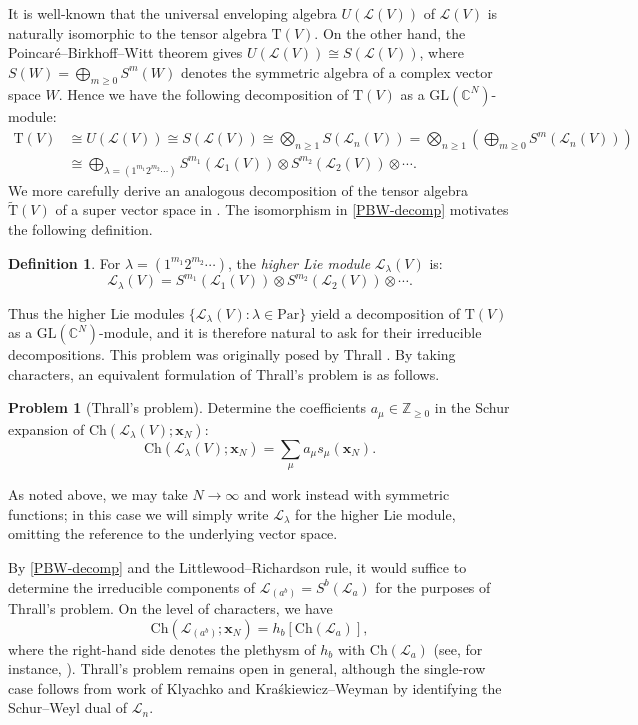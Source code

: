 \documentclass[11pt]{article}
\theoremstyle{definition}
\newtheorem{defi}[theo]{Definition}
\newtheorem{prob}[theo]{Problem}
\numberwithin{equation}{section}
\newcommand\CC{\mathbb{C}}
\newcommand\ZZ{\mathbb{Z}}
\newcommand\GL{\mathrm{GL}}
\newcommand\Srm{S}
\newcommand\Trm{\mathrm{T}}
\newcommand\xb{\mathbf{x}}
\newcommand\Lcal{\mathcal{L}}
\newcommand\Trmtil{\widetilde{\Trm}}
\newcommand\Ch{\mathrm{Ch}}
\begin{document}
It is well-known that the universal enveloping algebra $U(\Lcal(V))$ of $\Lcal(V)$ is naturally isomorphic to the tensor algebra $\Trm(V)$. On the other hand, the Poincar\'e--Birkhoff--Witt theorem gives $U(\Lcal(V)) \cong S(\Lcal(V))$, where $\Srm(W) = \bigoplus_{m \ge 0} \Srm^m(W)$ denotes the symmetric algebra of a complex vector space $W$. Hence we have the following decomposition of $\Trm(V)$ as a $\GL(\CC^N)$-module:
\begin{align}
\Trm(V) &\cong U(\Lcal(V)) \cong \Srm(\Lcal(V)) \cong \bigotimes_{n \ge 1} \Srm(\Lcal_n(V)) = \bigotimes_{n \ge 1} \left( \bigoplus_{m \ge 0} \Srm^m(\Lcal_n(V)) \right) \nonumber \\
&\cong \bigoplus_{\lambda = (1^{m_1}2^{m_2} \cdots)} \Srm^{m_1}(\Lcal_1(V)) \otimes \Srm^{m_2}(\Lcal_2(V)) \otimes \cdots. \label{PBW-decomp}
\end{align}
We more carefully derive an analogous decomposition of the tensor algebra $\Trmtil(V)$ of a super vector space in . The isomorphism in \eqref{PBW-decomp} motivates the following definition.
\begin{defi}\label{def:lie-mod}
For $\lambda = (1^{m_1}2^{m_2} \cdots)$, the \emph{higher Lie module} $\Lcal_\lambda(V)$ is:
\[
\Lcal_\lambda(V) = \Srm^{m_1}(\Lcal_1(V)) \otimes \Srm^{m_2}(\Lcal_2(V)) \otimes \cdots.
\]
\end{defi}
Thus the higher Lie modules $\{ \Lcal_\lambda(V) : \lambda \in \mathrm{Par} \}$ yield a decomposition of $\Trm(V)$ as a $\GL(\CC^N)$-module, and it is therefore natural to ask for their irreducible decompositions. This problem was originally posed by Thrall \cite{Thrall}. By taking characters, an equivalent formulation of Thrall's problem is as follows.
\begin{prob}[Thrall's problem]
  Determine the coefficients $a_\mu \in \ZZ_{\ge 0}$ in the Schur expansion of $\Ch(\Lcal_\lambda(V);\xb_N)$:
  \[
  \Ch(\Lcal_\lambda(V);\xb_N) = \sum_\mu a_\mu s_\mu(\xb_N).
  \]
\end{prob}
As noted above, we may take $N \to \infty$ and work instead with symmetric functions; in this case we will simply write $\Lcal_\lambda$ for the higher Lie module, omitting the reference to the underlying vector space.

By \eqref{PBW-decomp} and the Littlewood--Richardson rule, it would suffice to determine the irreducible components of $\Lcal_{(a^b)} = S^b(\Lcal_a)$ for the purposes of Thrall's problem. On the level of characters, we have
\[
\Ch(\Lcal_{(a^b)};\xb_N) = h_b[\Ch(\Lcal_a)],
\]
where the right-hand side denotes the plethysm of $h_b$ with $\Ch(\Lcal_a)$ (see, for instance, \cite[Appendix~2]{Stan}). Thrall's problem remains open in general, although the single-row case follows from work of Klyachko \cite{Kly} and Kra{\'s}kiewicz--Weyman \cite{KW} by identifying the Schur--Weyl dual of $\Lcal_n$.
\end{document}
